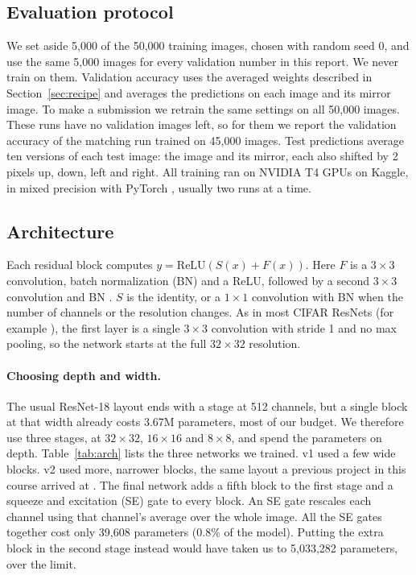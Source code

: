 \documentclass{article}
\begin{document}
\subsection{Evaluation protocol}
We set aside 5,000 of the 50,000 training images, chosen with random seed 0, and use the same 5,000 images for every
validation number in this report. We never train on them. Validation accuracy uses the averaged weights described in
Section~\ref{sec:recipe} and averages the predictions on each image and its mirror image. To make a submission we retrain
the same settings on all 50,000 images. These runs have no validation images left, so for them we report the validation
accuracy of the matching run trained on 45,000 images. Test predictions average ten versions of each test image: the
image and its mirror, each also shifted by 2 pixels up, down, left and right. All training ran on NVIDIA T4 GPUs on
Kaggle, in mixed precision \citep{micikevicius2018mixed} with PyTorch \citep{paszke2019pytorch}, usually two runs at a time.

\subsection{Architecture}
\label{sec:arch}
Each residual block computes $y = \mathrm{ReLU}(S(x) + F(x))$. Here $F$ is a $3{\times}3$ convolution, batch normalization
(BN) and a ReLU, followed by a second $3{\times}3$ convolution and BN \citep{he2016resnet,ioffe2015bn}. $S$ is the identity,
or a $1{\times}1$ convolution with BN when the number of channels or the resolution changes. As in most CIFAR ResNets
(for example \citealp{kuangliu2017pytorchcifar}), the first layer is a single $3{\times}3$ convolution with stride 1 and no
max pooling, so the network starts at the full $32\times32$ resolution.

\paragraph{Choosing depth and width.} The usual ResNet-18 layout ends with a stage at 512 channels, but a single block at
that width already costs 3.67M parameters, most of our budget. We therefore use three stages, at $32\times32$,
$16\times16$ and $8\times8$, and spend the parameters on depth. Table~\ref{tab:arch} lists the three networks we trained.
v1 used a few wide blocks. v2 used more, narrower blocks, the same layout a previous project in this course arrived at
\citep{thakur2023efficient}. The final network adds a fifth block to the first stage and a squeeze and excitation (SE)
gate to every block. An SE gate rescales each channel using that channel's average over the whole image. All the SE
gates together cost only 39,608 parameters (0.8\% of the model). Putting the extra block in the second stage instead
would have taken us to 5,033,282 parameters, over the limit.
\end{document}

